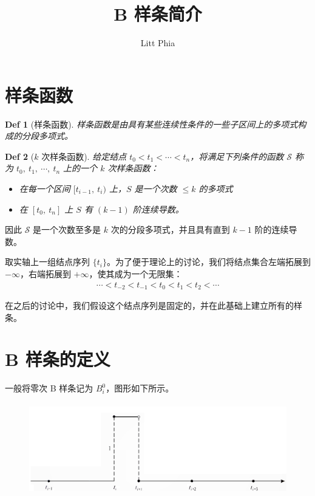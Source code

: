 \documentclass[a4paper]{article}
\title{B 样条简介}
\author{Litt Phia}
\newtheorem*{definition}{Def}
\begin{document}
\maketitle
\tableofcontents

\clearpage
\section{样条函数}

\begin{definition}[样条函数]
    样条函数是由具有某些连续性条件的一些子区间上的多项式构成的分段多项式。
\end{definition}

\begin{definition}[$k$ 次样条函数]
    给定结点 $t_0 < t_1 < \cdots < t_n$，将满足下列条件的函数 $\mathcal{S}$ 称为 $t_0,\ t_1,\ \cdots,\ t_n$ 上的一个 $k$ 次样条函数：
    \begin{itemize}
        \item[1] 在每一个区间 $[t_{i - 1},\ t_{i})$ 上，$S$ 是一个次数 $\leqslant k$ 的多项式
        \item[2] 在 $[t_0,\ t_n]$ 上 $S$ 有 $(k - 1)$ 阶连续导数。
    \end{itemize}
\end{definition}
    \noindent 因此 $\mathcal{S}$ 是一个次数至多是 $k$ 次的分段多项式，并且具有直到 $k - 1$ 阶的连续导数。

    取实轴上一组结点序列 $\{t_i\}$。为了便于理论上的讨论，我们将结点集合左端拓展到 $-\infty$，右端拓展到 $+\infty$，使其成为一个无限集：
    \begin{gather*}
        \cdots < t_{-2} < t_{-1} < t_{0} < t_{1} < t_{2} < \cdots
    \end{gather*}

    在之后的讨论中，我们假设这个结点序列是固定的，并在此基础上建立所有的样条。


\section{B 样条的定义}

    \noindent 一般将零次 B 样条记为 $B_i^0$，图形如下所示。
    \begin{figure}[H]
        \centering
        \includegraphics[width = 12cm, height = 4cm]{0-order-BSpline.png}
    \end{figure}
\end{document}

